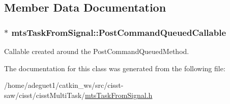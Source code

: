 \subsection{Member Data Documentation}
\hypertarget{classmts_task_from_signal_a9ca1f20e2ea7595968e75ff793722dfc}{
\subsubsection[{Post\-Command\-Queued\-Callable}]{$\ast$ mts\-Task\-From\-Signal\-::\-Post\-Command\-Queued\-Callable\hspace{0.3cm}{\ttfamily [protected]}}}\label{classmts_task_from_signal_a9ca1f20e2ea7595968e75ff793722dfc}
Callable created around the Post\-Command\-Queued\-Method. 

The documentation for this class was generated from the following file\-:\begin{DoxyCompactItemize}
\item 
/home/adeguet1/catkin\-\_\-ws/src/cisst-\/saw/cisst/cisst\-Multi\-Task/\hyperlink{mts_task_from_signal_8h}{mts\-Task\-From\-Signal.\-h}\end{DoxyCompactItemize}
